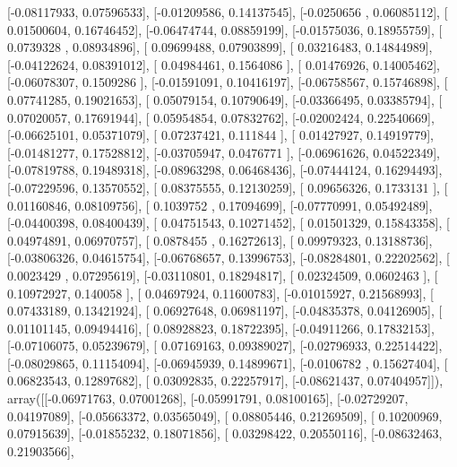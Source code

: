 \documentclass{article}
\begin{document}
       [-0.08117933,  0.07596533],
       [-0.01209586,  0.14137545],
       [-0.0250656 ,  0.06085112],
       [ 0.01500604,  0.16746452],
       [-0.06474744,  0.08859199],
       [-0.01575036,  0.18955759],
       [ 0.0739328 ,  0.08934896],
       [ 0.09699488,  0.07903899],
       [ 0.03216483,  0.14844989],
       [-0.04122624,  0.08391012],
       [ 0.04984461,  0.1564086 ],
       [ 0.01476926,  0.14005462],
       [-0.06078307,  0.1509286 ],
       [-0.01591091,  0.10416197],
       [-0.06758567,  0.15746898],
       [ 0.07741285,  0.19021653],
       [ 0.05079154,  0.10790649],
       [-0.03366495,  0.03385794],
       [ 0.07020057,  0.17691944],
       [ 0.05954854,  0.07832762],
       [-0.02002424,  0.22540669],
       [-0.06625101,  0.05371079],
       [ 0.07237421,  0.111844  ],
       [ 0.01427927,  0.14919779],
       [-0.01481277,  0.17528812],
       [-0.03705947,  0.0476771 ],
       [-0.06961626,  0.04522349],
       [-0.07819788,  0.19489318],
       [-0.08963298,  0.06468436],
       [-0.07444124,  0.16294493],
       [-0.07229596,  0.13570552],
       [ 0.08375555,  0.12130259],
       [ 0.09656326,  0.1733131 ],
       [ 0.01160846,  0.08109756],
       [ 0.1039752 ,  0.17094699],
       [-0.07770991,  0.05492489],
       [-0.04400398,  0.08400439],
       [ 0.04751543,  0.10271452],
       [ 0.01501329,  0.15843358],
       [ 0.04974891,  0.06970757],
       [ 0.0878455 ,  0.16272613],
       [ 0.09979323,  0.13188736],
       [-0.03806326,  0.04615754],
       [-0.06768657,  0.13996753],
       [-0.08284801,  0.22202562],
       [ 0.0023429 ,  0.07295619],
       [-0.03110801,  0.18294817],
       [ 0.02324509,  0.0602463 ],
       [ 0.10972927,  0.140058  ],
       [ 0.04697924,  0.11600783],
       [-0.01015927,  0.21568993],
       [ 0.07433189,  0.13421924],
       [ 0.06927648,  0.06981197],
       [-0.04835378,  0.04126905],
       [ 0.01101145,  0.09494416],
       [ 0.08928823,  0.18722395],
       [-0.04911266,  0.17832153],
       [-0.07106075,  0.05239679],
       [ 0.07169163,  0.09389027],
       [-0.02796933,  0.22514422],
       [-0.08029865,  0.11154094],
       [-0.06945939,  0.14899671],
       [-0.0106782 ,  0.15627404],
       [ 0.06823543,  0.12897682],
       [ 0.03092835,  0.22257917],
       [-0.08621437,  0.07404957]]), array([[-0.06971763,  0.07001268],
       [-0.05991791,  0.08100165],
       [-0.02729207,  0.04197089],
       [-0.05663372,  0.03565049],
       [ 0.08805446,  0.21269509],
       [ 0.10200969,  0.07915639],
       [-0.01855232,  0.18071856],
       [ 0.03298422,  0.20550116],
       [-0.08632463,  0.21903566],
\end{document}
